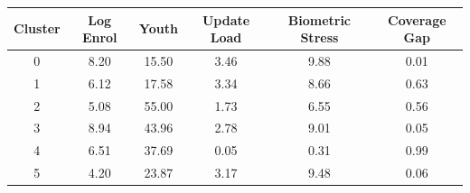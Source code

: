 \begin{tabular}{c c c c c c}
\toprule
Cluster & Log Enrol & Youth  & Update Load & Biometric Stress & Coverage Gap \\
\midrule
0 & 8.20 & 15.50 & 3.46 & 9.88 & 0.01 \\
1 & 6.12 & 17.58 & 3.34 & 8.66 & 0.63 \\
2 & 5.08 & 55.00 & 1.73 & 6.55 & 0.56 \\
3 & 8.94 & 43.96 & 2.78 & 9.01 & 0.05 \\
4 & 6.51 & 37.69 & 0.05 & 0.31 & 0.99 \\
5 & 4.20 & 23.87 & 3.17 & 9.48 & 0.06 \\
\bottomrule
\end{tabular}
